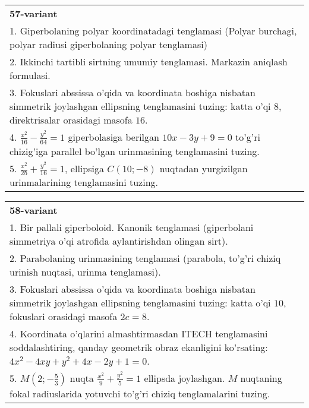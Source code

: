 \documentclass{article}
\begin{document}
\begin{tabular}{m{17cm}}
\textbf{57-variant}\\
1. Giperbolaning polyar koordinatadagi tenglamasi (Polyar burchagi, polyar radiusi giperbolaning polyar tenglamasi)\\

2. Ikkinchi tartibli sirtning umumiy tenglamasi. Markazin aniqlash formulasi.\\

3. Fokuslari abssissa o'qida va koordinata boshiga nisbatan simmetrik joylashgan ellipsning tenglamasini tuzing: katta o'qi $8$, direktrisalar orasidagi masofa $16$.\\

4. $\frac{x^{2}}{16} - \frac{y^{2}}{64} = 1$ giperbolasiga berilgan $10x - 3y + 9 = 0$ to'g'ri chizig'iga parallel bo'lgan urinmasining tenglamasini tuzing.  \\

5. $\frac{x^{2}}{25} + \frac{y^{2}}{16} = 1$, ellipsiga $C(10; - 8)$ nuqtadan yurgizilgan urinmalarining tenglamasini tuzing.  
\end{tabular}
\vspace{1cm}


\begin{tabular}{m{17cm}}
\textbf{58-variant}\\
1. Bir pallali giperboloid. Kanonik tenglamasi (giperbolani simmetriya o'qi atrofida aylantirishdan olingan sirt).\\

2. Parabolaning urinmasining tenglamasi (parabola, to'g'ri chiziq urinish nuqtasi, urinma tenglamasi).\\

3. Fokuslari abssissa o'qida va koordinata boshiga nisbatan simmetrik joylashgan ellipsning tenglamasini tuzing: katta o'qi $10$, fokuslari orasidagi masofa $2c=8$.\\

4. Koordinata o'qlarini almashtirmasdan ITECH tenglamasini soddalashtiring, qanday geometrik obraz ekanligini ko'rsating: $4x^{2} - 4xy + y^{2} + 4x - 2y + 1 = 0$.  \\

5. $M(2; - \frac{5}{3})$ nuqta $\frac{x^{2}}{9} + \frac{y^{2}}{5} = 1$ ellipsda joylashgan. $M$ nuqtaning fokal radiuslarida yotuvchi to'g'ri chiziq tenglamalarini tuzing.  
\end{tabular}
\vspace{1cm}
\end{document}
